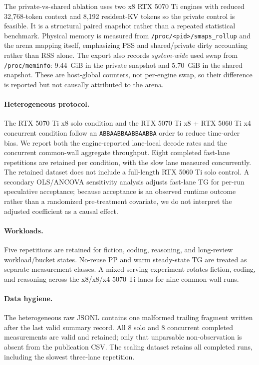 The private-vs-shared ablation uses two x8 RTX 5070 Ti engines with reduced 32,768-token context and 8,192 resident-KV tokens so the private control is feasible. It is a structural paired snapshot rather than a repeated statistical benchmark. Physical memory is measured from \texttt{/proc/<pid>/smaps\_rollup} and the arena mapping itself, emphasizing PSS and shared/private dirty accounting rather than RSS alone. The export also records \emph{system-wide} used swap from \texttt{/proc/meminfo}: 9.44~GiB in the private snapshot and 5.70~GiB in the shared snapshot. These are host-global counters, not per-engine swap, so their difference is reported but not causally attributed to the arena.

\paragraph{Heterogeneous protocol.}
The RTX 5070 Ti x8 solo condition and the RTX 5070 Ti x8 + RTX 5060 Ti x4 concurrent condition follow an \texttt{ABBAABBAABBAABBA} order to reduce time-order bias. We report both the engine-reported lane-local decode rates and the concurrent common-wall aggregate throughput. Eight completed fast-lane repetitions are retained per condition, with the slow lane measured concurrently. The retained dataset does not include a full-length RTX 5060 Ti solo control. A secondary OLS/ANCOVA sensitivity analysis adjusts fast-lane TG for per-run speculative acceptance; because acceptance is an observed runtime outcome rather than a randomized pre-treatment covariate, we do not interpret the adjusted coefficient as a causal effect.

\paragraph{Workloads.}
Five repetitions are retained for fiction, coding, reasoning, and long-review workload/bucket states. No-reuse PP and warm steady-state TG are treated as separate measurement classes. A mixed-serving experiment rotates fiction, coding, and reasoning across the x8/x8/x4 5070 Ti lanes for nine common-wall runs.

\paragraph{Data hygiene.}
The heterogeneous raw JSONL contains one malformed trailing fragment written after the last valid summary record. All 8 solo and 8 concurrent completed measurements are valid and retained; only that unparsable non-observation is absent from the publication CSV. The scaling dataset retains all completed runs, including the slowest three-lane repetition.

